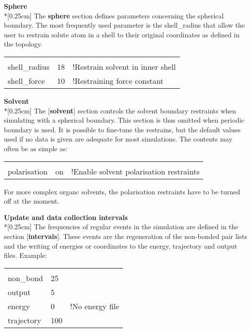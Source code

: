 \documentclass[a4paper,11pt]{article}
\begin{document}
\textbf{Sphere}\\*[0.25cm] The \textbf{sphere} section defines
parameters concerning the spherical boundary. The most frequently
used parameter is the shell\_radius that allow the user to
restrain solute atom in a shell to their original coordinates as
defined in the topology.

\begin{center}
\begin{tabularx}{\textwidth}{|l l X|}
  \hline
  [sphere]    &    & \\
  shell\_radius & 18 & !Restrain solvent in inner shell \\
  shell\_force & 10 & !Restraining force constant \\ \hline
\end{tabularx}
\end{center}

\textbf{Solvent}\\*[0.25cm] The [\textbf{solvent}] section
controls the solvent boundary restraints when simulating with a
spherical boundary. This section is thus omitted when periodic
boundary is used. It is possible to fine-tune the restrains, but
the default values used if no data is given are adequate for most
simulations. The contents may often be as simple as:

\begin{center}
\begin{tabularx}{\textwidth}{|l l X|}
  \hline
  [solvent]    &    & \\
  polarisation & on & !Enable solvent polarisation restraints \\ \hline
\end{tabularx}
\end{center}
For more complex organc solvents, the polarisation restraints have 
to be turned off at the moment.

\textbf{Update and data collection intervals}\\*[0.25cm] The
frequencies of regular events in the simulation are defined in the
section [\textbf{intervals}]. These events are the regeneration of
the non-bonded pair lists and the writing of energies or
coordinates to the energy, trajectory and output files. Example:

\begin{center}
\begin{tabularx}{\textwidth}{|l l X|}
  \hline
  [intervals] &     & \\
  non{\_}bond & 25  & \\
  output      & 5   & \\
  energy      & 0   & !No energy file \\
  trajectory  & 100 &  \\ \hline
\end{tabularx}
\end{center}
\end{document}
